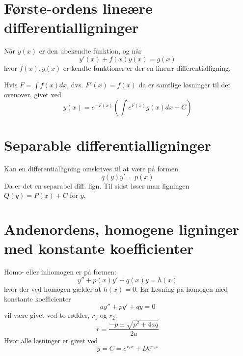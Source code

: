 \section{Første-ordens lineære differentialligninger}
Når $y(x)$ er den ubekendte funktion, og når$$y'(x)+f(x)y(x)=g(x)$$hvor $f(x),g(x)$ er kendte funktioner er der en lineær differentialligning.
\begin{theorem}
Hvis $F=\int f(x)dx$, dvs. $F'(x)=f(x)$ da er samtlige løsninger til det ovenover, givet ved\begin{equation}
    y(x)=e^{-F(x)}\left(\int e^{F(x)}g(x)dx+C\right)
\end{equation}
\end{theorem}
\section{Separable differentialligninger}
Kan en differentialligning omskrives til at være på formen\begin{equation}
    q(y)y'=p(x)
\end{equation}
Da er det en separabel diff. lign. Til sidst løser man ligningen $Q(y)=P(x)+C$ for $y$.
\section{Andenordens, homogene ligninger med konstante koefficienter}
Homo- eller inhomogen er på formen:$$y''+p(x)y'+q(x)y=h(x)$$
hvor der ved homogen gælder at $h(x)=0$. En Løsning på homogen med konstante koefficienter$$ay''+py'+qy=0$$vil være givet ved to rødder, $r_1$ og $r_2$:
\begin{equation}
    r=\frac{-p\pm\sqrt{p^2+4aq}}{2a}
\end{equation}
Hvor alle løsninger er givet ved $$y=C=e^{r_1x}+De^{r_2x}$$